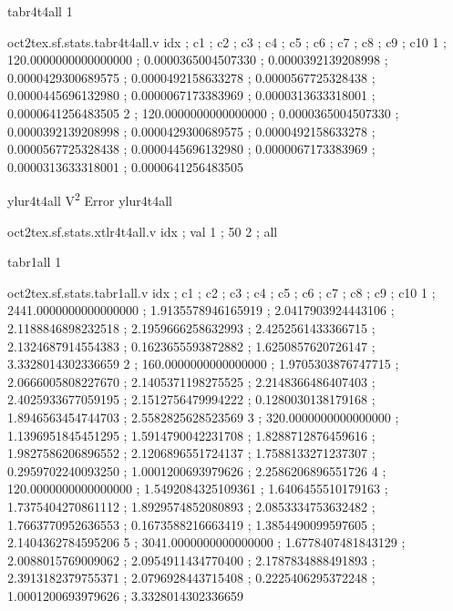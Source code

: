 \expandafter\def\csname oct2tex.sf.stats.tabr4t4all.t\endcsname{tabr4t4all}
\expandafter\def\csname oct2tex.sf.stats.tabr4t4all.u\endcsname{1}
\begin{filecontents}[overwrite]{oct2tex.sf.stats.tabr4t4all.v}
idx ; c1 ; c2 ; c3 ; c4 ; c5 ; c6 ; c7 ; c8 ; c9 ; c10
1 ; 120.0000000000000000 ; 0.0000365004507330 ; 0.0000392139208998 ; 0.0000429300689575 ; 0.0000492158633278 ; 0.0000567725328438 ; 0.0000445696132980 ; 0.0000067173383969 ; 0.0000313633318001 ; 0.0000641256483505
2 ; 120.0000000000000000 ; 0.0000365004507330 ; 0.0000392139208998 ; 0.0000429300689575 ; 0.0000492158633278 ; 0.0000567725328438 ; 0.0000445696132980 ; 0.0000067173383969 ; 0.0000313633318001 ; 0.0000641256483505
\end{filecontents}
\expandafter\def\csname oct2tex.sf.stats.ylur4t4all.t\endcsname{ylur4t4all}
\expandafter\def\csname oct2tex.sf.stats.ylur4t4all.u\endcsname{V\textsuperscript{2}}
\expandafter\def\csname oct2tex.sf.stats.ylur4t4all.v\endcsname{Error}
\expandafter\def\csname oct2tex.sf.stats.xtlr4t4all.t\endcsname{ylur4t4all}
\begin{filecontents}[overwrite]{oct2tex.sf.stats.xtlr4t4all.v}
idx ; val
1 ; 50
2 ; all
\end{filecontents}
\expandafter\def\csname oct2tex.sf.stats.tabr1all.t\endcsname{tabr1all}
\expandafter\def\csname oct2tex.sf.stats.tabr1all.u\endcsname{1}
\begin{filecontents}[overwrite]{oct2tex.sf.stats.tabr1all.v}
idx ; c1 ; c2 ; c3 ; c4 ; c5 ; c6 ; c7 ; c8 ; c9 ; c10
1 ; 2441.0000000000000000 ; 1.9135578946165919 ; 2.0417903924443106 ; 2.1188846898232518 ; 2.1959666258632993 ; 2.4252561433366715 ; 2.1324687914554383 ; 0.1623655593872882 ; 1.6250857620726147 ; 3.3328014302336659
2 ; 160.0000000000000000 ; 1.9705303876747715 ; 2.0666005808227670 ; 2.1405371198275525 ; 2.2148366486407403 ; 2.4025933677059195 ; 2.1512756479994222 ; 0.1280030138179168 ; 1.8946563454744703 ; 2.5582825628523569
3 ; 320.0000000000000000 ; 1.1396951845451295 ; 1.5914790042231708 ; 1.8288712876459616 ; 1.9827586206896552 ; 2.1206896551724137 ; 1.7588133271237307 ; 0.2959702240093250 ; 1.0001200693979626 ; 2.2586206896551726
4 ; 120.0000000000000000 ; 1.5492084325109361 ; 1.6406455510179163 ; 1.7375404270861112 ; 1.8929574852080893 ; 2.0853334753632482 ; 1.7663770952636553 ; 0.1673588216663419 ; 1.3854490099597605 ; 2.1404362784595206
5 ; 3041.0000000000000000 ; 1.6778407481843129 ; 2.0088015769009062 ; 2.0954911434770400 ; 2.1787834888491893 ; 2.3913182379755371 ; 2.0796928443715408 ; 0.2225406295372248 ; 1.0001200693979626 ; 3.3328014302336659
\end{filecontents}
